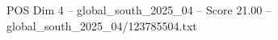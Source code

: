 \begin{textsample}{POS Dim 4 – global\_south\_2025\_04 – Score 21.00 – global\_south\_2025\_04/123785504.txt}
\end{textsample}
